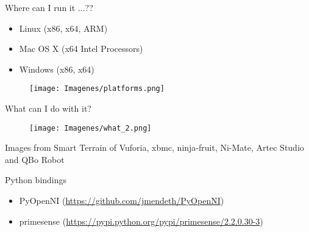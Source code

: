 \documentclass[bigger]{beamer}
\begin{document}
\begin{frame}{ Where can I run it ...??}
\begin{minipage}{0.47\textwidth}
\begin{itemize}
	\item Linux (x86, x64, ARM)
	\item Mac OS X (x64 Intel Processors)
	\item Windows (x86, x64)
\end{itemize}
\end{minipage}
\begin{minipage}{0.5\textwidth}
\begin{figure}[h]
		\texttt{[image: Imagenes/platforms.png]}
\end{figure}
\end{minipage}
\end{frame}


\begin{frame}{ What can I do with it?}

\begin{figure}[h]
		\texttt{[image: Imagenes/what\_2.png]}
\end{figure}
\tiny{Images from Smart Terrain \texttrademark of Vuforia\texttrademark, xbmc, ninja-fruit, Ni-Mate, Artec Studio\\ and QBo Robot}
\end{frame}

\begin{frame}[fragile]{ Python bindings}
\begin{itemize}
	\item PyOpenNI (\url{https://github.com/jmendeth/PyOpenNI})
	\item primesense (\url{https://pypi.python.org/pypi/primesense/2.2.0.30-3})
\end{itemize}

\end{frame}
\end{document}
